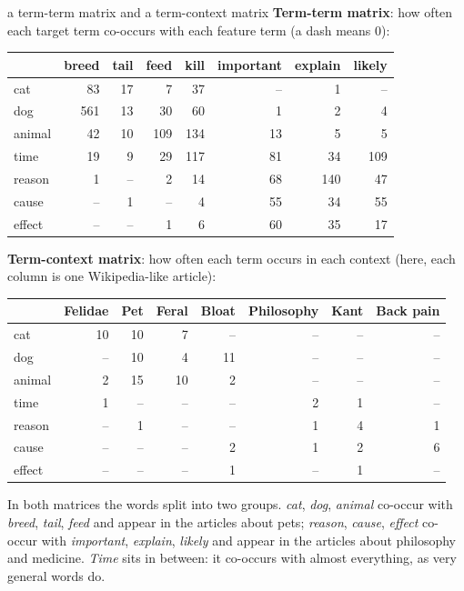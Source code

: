 \begin{nbexample}{a term-term matrix and a term-context matrix}
\textbf{Term-term matrix}: how often each target term co-occurs with each feature term
(a dash means 0):
\begin{center}
\small
\begin{tabular}{@{}l rrrrrrr@{}}
\toprule
 & breed & tail & feed & kill & important & explain & likely \\
\midrule
cat    & 83  & 17 & 7   & 37  & --  & 1   & --  \\
dog    & 561 & 13 & 30  & 60  & 1   & 2   & 4   \\
animal & 42  & 10 & 109 & 134 & 13  & 5   & 5   \\
time   & 19  & 9  & 29  & 117 & 81  & 34  & 109 \\
reason & 1   & -- & 2   & 14  & 68  & 140 & 47  \\
cause  & --  & 1  & --  & 4   & 55  & 34  & 55  \\
effect & --  & -- & 1   & 6   & 60  & 35  & 17  \\
\bottomrule
\end{tabular}
\end{center}
\textbf{Term-context matrix}: how often each term occurs in each context (here, each
column is one Wikipedia-like article):
\begin{center}
\small
\begin{tabular}{@{}l rrrrrrr@{}}
\toprule
 & Felidae & Pet & Feral & Bloat & Philosophy & Kant & Back pain \\
\midrule
cat    & 10 & 10 & 7  & -- & -- & -- & -- \\
dog    & -- & 10 & 4  & 11 & -- & -- & -- \\
animal & 2  & 15 & 10 & 2  & -- & -- & -- \\
time   & 1  & -- & -- & -- & 2  & 1  & -- \\
reason & -- & 1  & -- & -- & 1  & 4  & 1  \\
cause  & -- & -- & -- & 2  & 1  & 2  & 6  \\
effect & -- & -- & -- & 1  & -- & 1  & -- \\
\bottomrule
\end{tabular}
\end{center}
In both matrices the words split into two groups. \emph{cat}, \emph{dog},
\emph{animal} co-occur with \emph{breed}, \emph{tail}, \emph{feed} and appear in the
articles about pets; \emph{reason}, \emph{cause}, \emph{effect} co-occur with
\emph{important}, \emph{explain}, \emph{likely} and appear in the articles about
philosophy and medicine. \emph{Time} sits in between: it co-occurs with almost
everything, as very general words do.
\end{nbexample}

